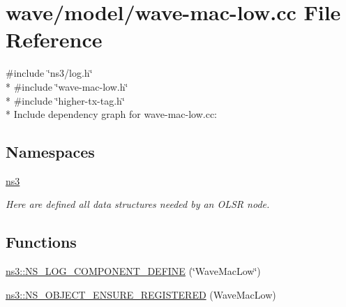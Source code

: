 \hypertarget{wave-mac-low_8cc}{}\section{wave/model/wave-\/mac-\/low.cc File Reference}
\label{wave-mac-low_8cc}
{\ttfamily \#include \char`\"{}ns3/log.\+h\char`\"{}}\\*
{\ttfamily \#include \char`\"{}wave-\/mac-\/low.\+h\char`\"{}}\\*
{\ttfamily \#include \char`\"{}higher-\/tx-\/tag.\+h\char`\"{}}\\*
Include dependency graph for wave-\/mac-\/low.cc\+:
\subsection*{Namespaces}
\begin{DoxyCompactItemize}
\item 
 \hyperlink{namespacens3}{ns3}
\begin{DoxyCompactList}\small\item\em Here are defined all data structures needed by an O\+L\+SR node. \end{DoxyCompactList}\end{DoxyCompactItemize}
\subsection*{Functions}
\begin{DoxyCompactItemize}
\item 
\hyperlink{namespacens3_ad99054539ae99675120c74d7e3ec36bb}{ns3\+::\+N\+S\+\_\+\+L\+O\+G\+\_\+\+C\+O\+M\+P\+O\+N\+E\+N\+T\+\_\+\+D\+E\+F\+I\+NE} (\char`\"{}Wave\+Mac\+Low\char`\"{})
\item 
\hyperlink{namespacens3_a26fc7fdc455f4732dde5da922f3c64b4}{ns3\+::\+N\+S\+\_\+\+O\+B\+J\+E\+C\+T\+\_\+\+E\+N\+S\+U\+R\+E\+\_\+\+R\+E\+G\+I\+S\+T\+E\+R\+ED} (Wave\+Mac\+Low)
\end{DoxyCompactItemize}

